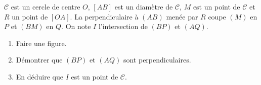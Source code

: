 
$\mathscr{C}$ est un cercle de centre $O$, $[AB]$ est un diamètre de $\mathscr{C}$, $M$ est un point de $\mathscr{C}$ et $R$ un point de $[OA]$. La perpendiculaire à $(AB)$ menée par $R$ coupe $(M)$ en $P$ et $(BM)$ en $Q$. On note $I$ l'intersection de $(BP)$ et $(AQ)$.
\begin{enumerate}
\item Faire une figure.
\item Démontrer que $(BP)$ et $(AQ)$ sont perpendiculaires.
\item En déduire que $I$ est un point de $\mathscr{C}$.
\end{enumerate}